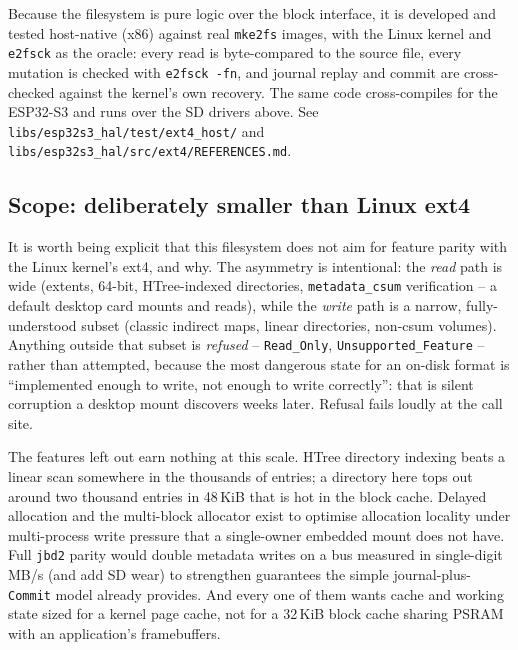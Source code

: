 Because the filesystem is pure logic over the block interface, it is developed and
tested host-native (x86) against real \texttt{mke2fs} images, with the Linux
kernel and \texttt{e2fsck} as the oracle: every read is byte-compared to the
source file, every mutation is checked with \texttt{e2fsck -fn}, and journal
replay and commit are cross-checked against the kernel's own recovery. The same
code cross-compiles for the ESP32-S3 and runs over the SD drivers above. See
\texttt{libs/esp32s3\_hal/test/ext4\_host/} and
\texttt{libs/esp32s3\_hal/src/ext4/REFERENCES.md}.

\subsection{Scope: deliberately smaller than Linux ext4}

It is worth being explicit that this filesystem does not aim for feature parity
with the Linux kernel's ext4, and why. The asymmetry is intentional: the
\emph{read} path is wide (extents, 64-bit, HTree-indexed directories,
\texttt{metadata\_csum} verification -- a default desktop card mounts and reads),
while the \emph{write} path is a narrow, fully-understood subset (classic
indirect maps, linear directories, non-csum volumes). Anything outside that
subset is \emph{refused} -- \texttt{Read\_Only}, \texttt{Unsupported\_Feature} --
rather than attempted, because the most dangerous state for an on-disk format
is ``implemented enough to write, not enough to write correctly'': that is
silent corruption a desktop mount discovers weeks later. Refusal fails loudly
at the call site.

The features left out earn nothing at this scale. HTree directory indexing
beats a linear scan somewhere in the thousands of entries; a directory here
tops out around two thousand entries in 48\,KiB that is hot in the block cache.
Delayed allocation and the multi-block allocator exist to optimise allocation
locality under multi-process write pressure that a single-owner embedded mount
does not have. Full \texttt{jbd2} parity would double metadata writes on a bus
measured in single-digit MB/s (and add SD wear) to strengthen guarantees the
simple journal-plus-\texttt{Commit} model already provides. And every one of
them wants cache and working state sized for a kernel page cache, not for a
32\,KiB block cache sharing PSRAM with an application's framebuffers.

